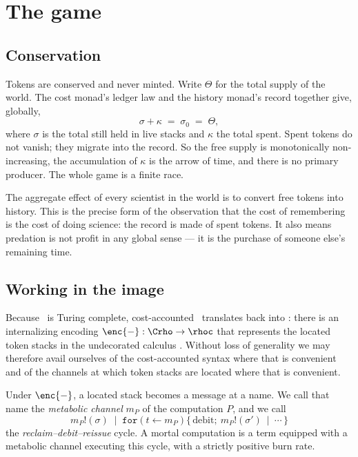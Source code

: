 \section{The game}\label{sci:S7}
\label{sci:sec:game}

\subsection{Conservation}\label{sci:S7.1}

Tokens are conserved and never minted. Write $\Theta$ for the total supply of the world. The cost
monad's ledger law and the history monad's record together give, globally,
\[
\sigma + \kappa \;=\; \sigma_0 \;=\; \Theta ,
\]
where $\sigma$ is the total still held in live stacks and $\kappa$ the total spent. Spent tokens do
not vanish; they migrate into the record. So the free supply is monotonically non-increasing, the
accumulation of $\kappa$ is the arrow of time, and there is no primary producer. The whole game is a
finite race.

\begin{remark}\label{sci:science-entropy-production}
The aggregate effect of every scientist in the world is to convert free tokens into history. This is
the precise form of the observation that the cost of remembering is the cost of doing science: the
record is made of spent tokens. It also means predation is not profit in any global sense --- it is
the purchase of someone else's remaining time.
\end{remark}

\subsection{Working in the image}\label{sci:S7.2}
\label{sci:sec:image}

Because \rhoc\ is Turing complete, cost-accounted \rhoc\ translates back into \rhoc: there is an
internalizing encoding $\enc{-} : \Crho \to \rhoc$ that represents the located token stacks in the
undecorated calculus \cite[\S6]{Omnibus}. Without loss of generality we may therefore avail ourselves
of the cost-accounted syntax where that is convenient and of the channels at which token stacks are
located where that is convenient.

\begin{definition}
\label{sci:def:metabolic}
Under $\enc{-}$, a located stack becomes a message at a name. We call that name the \emph{metabolic
channel} $m_P$ of the computation $P$, and we call
\[
m_P!(\sigma) \;\mid\; \texttt{for}(t \leftarrow m_P)\{\, \text{debit};\ m_P!(\sigma')\ \mid\ \cdots \,\}
\]
the \emph{reclaim--debit--reissue} cycle. A mortal computation is a term equipped with a metabolic
channel executing this cycle, with a strictly positive burn rate.
\end{definition}

